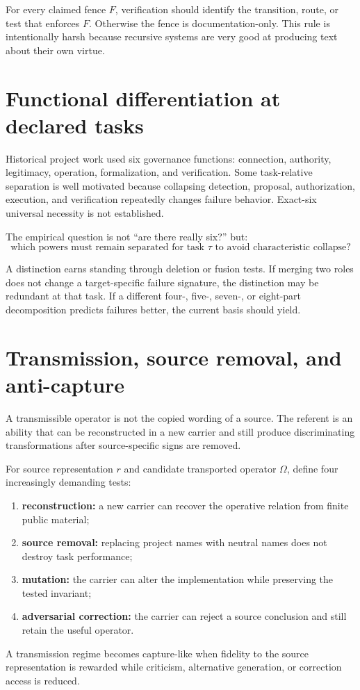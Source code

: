 For every claimed fence $F$, verification should identify the transition, route, or test that enforces $F$. Otherwise the fence is documentation-only. This rule is intentionally harsh because recursive systems are very good at producing text about their own virtue.

\section{Functional differentiation at declared tasks}

Historical project work used six governance functions: connection, authority, legitimacy, operation, formalization, and verification. Some task-relative separation is well motivated because collapsing detection, proposal, authorization, execution, and verification repeatedly changes failure behavior. Exact-six universal necessity is not established.

The empirical question is not ``are there really six?'' but:
\begin{equation}
\text{which powers must remain separated for task }\tau\text{ to avoid characteristic collapse?}
\end{equation}

A distinction earns standing through deletion or fusion tests. If merging two roles does not change a target-specific failure signature, the distinction may be redundant at that task. If a different four-, five-, seven-, or eight-part decomposition predicts failures better, the current basis should yield.

\section{Transmission, source removal, and anti-capture}
\label{sec:deep-transmission}

A transmissible operator is not the copied wording of a source. The referent is an ability that can be reconstructed in a new carrier and still produce discriminating transformations after source-specific signs are removed.

For source representation $r$ and candidate transported operator $\Omega$, define four increasingly demanding tests:
\begin{enumerate}
\item \textbf{reconstruction:} a new carrier can recover the operative relation from finite public material;
\item \textbf{source removal:} replacing project names with neutral names does not destroy task performance;
\item \textbf{mutation:} the carrier can alter the implementation while preserving the tested invariant;
\item \textbf{adversarial correction:} the carrier can reject a source conclusion and still retain the useful operator.
\end{enumerate}
A transmission regime becomes capture-like when fidelity to the source representation is rewarded while criticism, alternative generation, or correction access is reduced.

